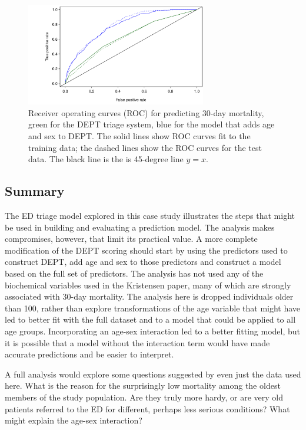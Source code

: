 \begin{figure}[!tbh]
  \centering
  \includegraphics[width=0.70\textwidth]
  {ch_logistic_regression_oi_biostat/figures/ROCDanishED/ROCDanishED.pdf}
    \caption{Receiver operating curves (ROC) for predicting 30-day mortality,  green for the DEPT triage system, blue for the model that adds age and sex to DEPT\@.  The solid lines show ROC curves fit to the training data; the dashed lines show the ROC curves for the test data.  The black line is the is 45-degree line $y = x$. }
    \label{figure:ROCDanishED}
\end{figure}

\textD{\newpage}

\subsection{Summary}
\label{section:interpretationNewColorScore}

The ED triage model explored in this case study illustrates the steps that might be used in building and evaluating a prediction model.   The analysis makes compromises, however, that limit its practical value.  A more complete modification of the DEPT scoring should start by using the predictors used to construct DEPT, add age and sex to those predictors and construct a model based on the full set of predictors.   The analysis has not used any of the biochemical variables used in the Kristensen paper, many of which are strongly associated with 30-day mortality. The analysis here is dropped individuals older than 100, rather than explore transformations of the age variable that might have led to  better fit with the full dataset and to a model that could be applied to all age groups.  Incorporating an age-sex interaction led to a better fitting model, but it is possible that a model without the interaction term would have made accurate predictions and be easier to interpret. 

A full analysis would explore some questions suggested by even just the data used here.  What is the reason for the surprisingly low mortality among the oldest members of the study population. Are they truly more hardy, or are very old patients referred to the ED for different, perhaps less serious conditions?  What might explain the age-sex interaction? 

